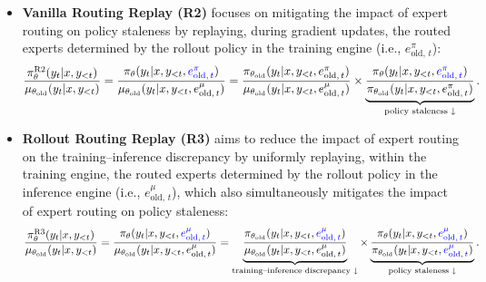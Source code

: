 \documentclass{article}
\begin{document}
\begin{itemize}[leftmargin=10mm, itemsep=2mm]

\item \textbf{Vanilla Routing Replay (R2)} \citep{gspo} focuses on mitigating the impact of expert routing on policy staleness by replaying, during gradient updates, the routed experts determined by the rollout policy in the training engine (i.e., \( e^{ \pi }_{ \text{old}, \, t } \)):
\begin{align*}
\frac{ \pi^\text{R2}_\theta ( y_t | x, y_{<t} ) }{ \mu_{ \theta_\text{old} } ( y_t | x, y_{<t} ) }
=
\frac{ \pi_\theta ( y_t | x, y_{<t}, \textcolor{blue}{ e^{ \pi }_{ \text{old}, \, t } } ) }{ \mu_{ \theta_\text{old} } ( y_t | x, y_{<t}, e^{ \mu }_{ \text{old}, \, t } ) }
=
\frac{ \pi_{ \theta_\text{old} } ( y_t | x, y_{<t}, e^{ \pi }_{ \text{old}, \, t } ) }{ \mu_{ \theta_\text{old} } ( y_t | x, y_{<t}, e^{ \mu }_{ \text{old}, \, t } ) } 
\times 
\underbrace{
    \frac{ \pi_\theta ( y_t | x, y_{<t}, \textcolor{blue}{ e^{ \pi }_{ \text{old}, \, t } } ) }{ \pi_{ \theta_\text{old} } ( y_t | x, y_{<t}, e^{ \pi }_{ \text{old}, \, t } ) }
}_\text{policy staleness ↓}.
\end{align*}

\item \textbf{Rollout Routing Replay (R3)} \citep{r3} aims to reduce the impact of expert routing on the training–inference discrepancy by uniformly replaying, within the training engine, the routed experts determined by the rollout policy in the inference engine (i.e., \( e^{ \mu }_{ \text{old}, \, t } \)), which also simultaneously mitigates the impact of expert routing on policy staleness:
\begin{align*}
\frac{ \pi^\text{R3}_\theta ( y_t | x, y_{<t} ) }{ \mu_{ \theta_\text{old} } ( y_t | x, y_{<t} ) }
=
\frac{ \pi_\theta ( y_t | x, y_{<t}, \textcolor{blue}{ e^{ \mu }_{ \text{old}, \, t } } ) }{ \mu_{ \theta_\text{old} } ( y_t | x, y_{<t}, e^{ \mu }_{ \text{old}, \, t } ) }
=
\underbrace{
    \frac{ \pi_{ \theta_\text{old} } ( y_t | x, y_{<t}, \textcolor{blue}{ e^{ \mu }_{ \text{old}, \, t } } ) }{ \mu_{ \theta_\text{old} } ( y_t | x, y_{<t}, e^{ \mu }_{ \text{old}, \, t } ) } 
}_\text{training–inference discrepancy ↓}
\times 
\underbrace{
    \frac{ \pi_\theta ( y_t | x, y_{<t}, \textcolor{blue}{ e^{ \mu }_{ \text{old}, \, t } } ) }{ \pi_{ \theta_\text{old} } ( y_t | x, y_{<t}, \textcolor{blue}{ e^{ \mu }_{ \text{old}, \, t } } ) }
}_\text{policy staleness ↓}.
\end{align*}

\end{itemize}
\end{document}
